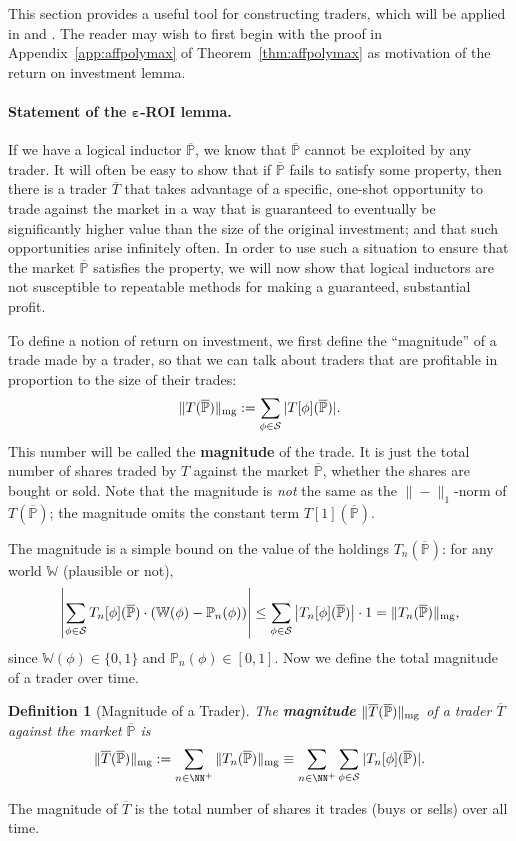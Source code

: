 \documentclass[authordate,onecolumn,noenvironments]{miri-tech-article}
\newtheorem{definition}[theorem]{Definition}
\numberwithin{equation}{subsection}
\newcommand{\seq}[1]{{\overline{#1}}}
\newcommand{\any}{-}
\newcommand{\li}{logical inductor}
\newcommand{\trade}{T}%
\newcommand{\Trader}{\seq{\trade}} %
\newcommand{\magn}[1]{{\|#1\|_1}} %
\newcommand{\magnit}[1]{{\|#1\|_{\rm mg}}} %
\newcommand{\BelState}{\mathbb{P}}
\newcommand{\pt}{\BelState}
\newcommand{\MP}{\seq{\pt}}
\newcommand{\World}{\mathbb{W}}
\newcommand{\Sentences}{\mathcal{S}}
\begin{document}
This section provides a useful tool for constructing traders, which will be applied in  and . The reader may wish to first begin with the proof in Appendix~\ref{app:affpolymax} of Theorem~\ref{thm:affpolymax} as motivation of the return on investment lemma.


\paragraph{Statement of the $\bm{\varepsilon}$-ROI lemma.}


If we have a \li{} $\MP$, we know that $\MP$ cannot be exploited by any trader. 
It will often be easy to show that if $\MP$ fails to satisfy some property, then there is a trader $\Trader$ that takes advantage of a specific, one-shot
opportunity to trade against the market in a way that is guaranteed to eventually be significantly higher value than the size of the original investment; 
and that such opportunities arise infinitely often.
In order to use such a situation to ensure that the market $\MP$ satisfies the property, we will now show that \li{}s are not susceptible to 
repeatable methods for making a guaranteed, substantial profit.

To define a notion of return on investment, we first define the ``magnitude'' of a trade made by a trader, so that we can talk about traders that are
profitable in proportion to the size of their trades:
%
\[ \magnit{\trade(\MP)} := \sum_{\phi\in\Sentences} |\trade[\phi](\MP)|. \]
%
This number will be called the \textbf{magnitude} of the trade.  It
is just the total number of shares traded by $\trade$ against the market $\MP$, whether the shares are
bought or sold. Note that the magnitude is \emph{not} the same as the $\magn{\any}$-norm of $\trade(\MP)$; the magnitude omits the constant term $\trade[1](\MP)$.  

The magnitude is a simple bound on the value of the holdings $\trade_n(\MP)$: for any world $\World$ (plausible or not),
%
\[
\left| \sum_{\phi\in\Sentences} \trade_n[\phi](\MP) \cdot \left(\World(\phi) - \pt_n(\phi)\right)\right|
\le \sum_{\phi\in\Sentences} \left| \trade_n[\phi](\MP)\right| \cdot 1  = \magnit{\trade_n(\MP)},  
\]
%
since $\World(\phi)\in\{0,1\}$ and $\pt_n(\phi)\in [0,1]$. 
Now we define the total magnitude of a trader over time.
%
\begin{definition}[Magnitude of a Trader]\label{def:tradermag}
  The \textbf{magnitude} $\magnit{\Trader(\MP)}$ of a trader $\Trader$ against the market $\MP$ is
%
\[ \magnit{\Trader(\MP)} := \sum_{n\in {\NN^+}}\magnit{\trade_n(\MP)} \equiv \sum_{n\in {\NN^+}} \sum_{\phi\in\Sentences}|\trade_n[\phi](\MP)|. \]
%
\end{definition}
%
The magnitude of $\Trader$ is the total number of shares it trades (buys or sells) over all time.
\end{document}

